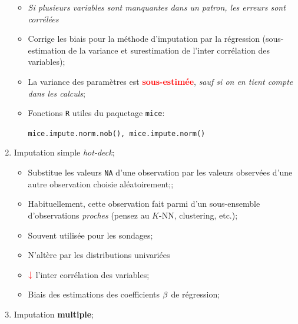 \documentclass[10pt, french]{article}
\begin{document}
\begin{multicols*}{3}
\begin{enumerate}[leftmargin = *]
\begin{itemize}[leftmargin = *]
		\item	\textit{Si plusieurs variables sont manquantes dans un patron, les erreurs sont corrélées}
		\item	Corrige les biais pour la méthode d'imputation par la régression (sous-estimation de la variance et surestimation de l'inter corrélation des variables);
		\item	La variance des paramètres est \textcolor{red}{\textbf{sous-estimée}}, \textit{sauf si on en tient compte dans les calculs};
		\item	Fonctions \texttt{R} utiles du paquetage \texttt{mice}:
			\begin{center}
			\texttt{mice.impute.norm.nob(), mice.impute.norm()}
			\end{center}
		\end{itemize}
	\item	Imputation simple \textit{hot-deck};
		\begin{itemize}[leftmargin = *]
		\item	Substitue les valeurs \texttt{NA} d'une observation par les valeurs observées d'une autre observation choisie aléatoirement;;
		\item	Habituellement, cette observation fait parmi d'un sous-ensemble d'observations \textit{proches} (pensez au $K$-NN, clustering, etc.);
		\item	Souvent utilisée pour les sondages;
		\item	N'altère par les distributions univariées
		\item	$\color{red}\downarrow$	l'inter corrélation des variables;
		\item	Biais des estimations des coefficients $\mathbf{\beta}$ de régression;
		\end{itemize}
	\item	Imputation \textbf{multiple};

\end{enumerate}
\end{multicols*}
\end{document}

